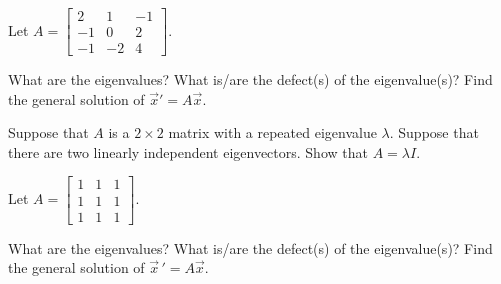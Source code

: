 \begin{exercise}
Let
$A = \left[ \begin{smallmatrix}
2 & 1 & -1 \\
-1 & 0 & 2 \\
-1 & -2 & 4
\end{smallmatrix} \right]$.
\begin{tasks}
\task What are the eigenvalues?
\task What is/are the defect(s) of the eigenvalue(s)?
\task Find the general solution of ${\vec{x}}' = A \vec{x}$.
\end{tasks}
\end{exercise}

\begin{exercise}
Suppose that $A$ is a $2 \times 2$ matrix with a repeated eigenvalue
$\lambda$.
Suppose that there are two linearly independent eigenvectors.  Show that
$A = \lambda I$.
\end{exercise}

\setcounter{exercise}{100}

\begin{exercise}
Let $A =
\left[ \begin{smallmatrix}
1 & 1 & 1 \\
1 & 1 & 1 \\
1 & 1 & 1 
\end{smallmatrix}\right]$.  
\begin{tasks}
\task What are the eigenvalues?
\task What is/are the defect(s) of the eigenvalue(s)?
\task Find the general solution of $\vec{x}\,' = A\vec{x}$.
\end{tasks}
\end{exercise}

